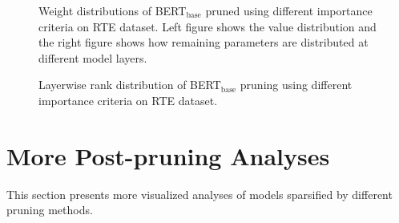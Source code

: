 \documentclass[11pt]{article}
\begin{document}
\begin{figure}[t]
	\centering
	\caption{Weight distributions of BERT$_{\text{base}}$ pruned using different importance criteria on RTE dataset. Left figure shows the value distribution and the right figure shows how remaining parameters are distributed at different model layers.}
	\label{fig:intersim}
\end{figure}
\begin{figure}[t]
	\centering
	\caption{Layerwise rank distribution of BERT$_{\text{base}}$ pruning using different importance criteria on RTE dataset.}
	\label{fig:rank_dist}
\end{figure}

\section{More Post-pruning Analyses}
This section presents more visualized analyses of models sparsified by different pruning methods. 
\end{document}
